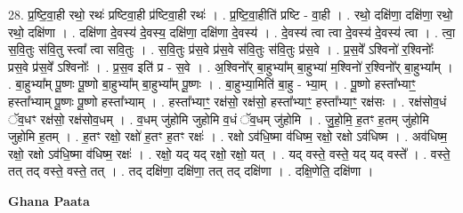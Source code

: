 \documentclass[17pt]{extarticle}
\begin{document}
28. प्र॒ष्टि॒वा॒ही रथो॒ रथः॑ प्रष्टिवा॒ही प्र॑ष्टिवा॒ही रथः॑ । . प्र॒ष्टि॒वा॒हीति॑ प्रष्टि - वा॒ही । . रथो॒ दक्षि॑णा॒ दक्षि॑णा॒ रथो॒ रथो॒ दक्षि॑णा । . दक्षि॑णा दे॒वस्य॑ दे॒वस्य॒ दक्षि॑णा॒ दक्षि॑णा दे॒वस्य॑ । . दे॒वस्य॑ त्वा त्वा दे॒वस्य॑ दे॒वस्य॑ त्वा । . त्वा॒ स॒वि॒तुः स॑वि॒तु स्त्वा᳚ त्वा सवि॒तुः । . स॒वि॒तुः प्र॑स॒वे प्र॑स॒वे स॑वि॒तुः स॑वि॒तुः प्र॑स॒वे । . प्र॒स॒वे᳚ ऽश्विनो॑ र॒श्विनोः᳚ प्रस॒वे प्र॑स॒वे᳚ ऽश्विनोः᳚ । . प्र॒स॒व इति॑ प्र - स॒वे । . अ॒श्विनो᳚र् बा॒हुभ्या᳚म् बा॒हुभ्या॑ म॒श्विनो॑ र॒श्विनो᳚र् बा॒हुभ्या᳚म् । . बा॒हुभ्या᳚म् पू॒ष्णः पू॒ष्णो बा॒हुभ्या᳚म् बा॒हुभ्या᳚म् पू॒ष्णः । . बा॒हुभ्या॒मिति॑ बा॒हु - भ्या॒म् । . पू॒ष्णो हस्ता᳚भ्याꣳ॒॒ हस्ता᳚भ्याम् पू॒ष्णः पू॒ष्णो हस्ता᳚भ्याम् । . हस्ता᳚भ्याꣳ॒॒ रक्ष॑सो॒ रक्ष॑सो॒ हस्ता᳚भ्याꣳ॒॒ हस्ता᳚भ्याꣳ॒॒ रक्ष॑सः । . रक्ष॑सोव॒धं ॅव॒धꣳ रक्ष॑सो॒ रक्ष॑सोव॒धम् । . व॒धम् जु॑होमि जुहोमि व॒धं ॅव॒धम् जु॑होमि । . जु॒हो॒मि॒ ह॒तꣳ ह॒तम् जु॑होमि जुहोमि ह॒तम् । . ह॒तꣳ रक्षो॒ रक्षो॑ ह॒तꣳ ह॒तꣳ रक्षः॑ । . रक्षो ऽव॑धि॒ष्मा व॑धिष्म॒ रक्षो॒ रक्षो ऽव॑धिष्म । . अव॑धिष्म॒ रक्षो॒ रक्षो ऽव॑धि॒ष्मा व॑धिष्म॒ रक्षः॑ । . रक्षो॒ यद् यद् रक्षो॒ रक्षो॒ यत् । . यद् वस्ते॒ वस्ते॒ यद् यद् वस्ते᳚ । . वस्ते॒ तत् तद् वस्ते॒ वस्ते॒ तत् । . तद् दक्षि॑णा॒ दक्षि॑णा॒ तत् तद् दक्षि॑णा । . दक्षि॒णेति॒ दक्षि॑णा । \newline

\textbf{Ghana Paata } \newline
\end{document}
